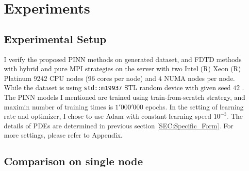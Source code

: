 \section{Experiments}
\subsection{Experimental Setup}
I verify the proposed PINN methods on generated dataset, and FDTD methods with hybrid and pure MPI strategies
on the server with two Intel (R) Xeon (R) Platinum 9242 CPU nodes (96 cores per node) and $4$ NUMA nodes per node.
While the dataset is using \texttt{std::m19937} STL random device with given seed $42$ \cite{STL:RANDOM_SEED}.
The PINN models I mentioned are trained using train-from-scratch strategy, and maximin number of training times is $1'000'000$ epochs.
In the setting of learning rate and optimizer, I chose to use Adam with constant learning speed $10^{-3}$.
The details of PDEs are determined in previous section \ref{SEC:Specific_Form}.  
For more settings, please refer to Appendix.

\subsection{Comparison on single node}



